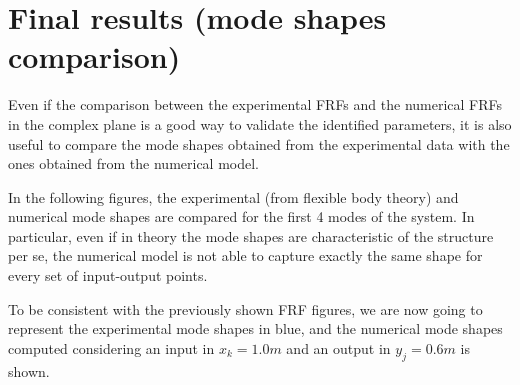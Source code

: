 \section{Final results (mode shapes comparison)}
\label{sec:final_results}

Even if the comparison between the experimental FRFs and the numerical FRFs in the complex plane is a good way to validate the identified parameters, it is also useful to compare the mode shapes obtained from the experimental data with the ones obtained from the numerical model.

In the following figures, the experimental (from flexible body theory) and numerical mode shapes are compared for the first 4 modes of the system.
In particular, even if in theory the mode shapes are characteristic of the structure per se, the numerical model is not able to capture exactly the same shape for every set of input-output points.

To be consistent with the previously shown FRF figures, we are now going to represent the experimental mode shapes in blue, and the numerical mode shapes computed considering an input in $x_k = 1.0m$ and an output in $y_j = 0.6m$ is shown.

